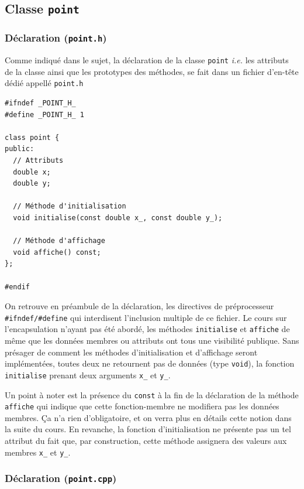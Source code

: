 \documentclass{book}
\begin{document}
\begin{correction}
\subsection*{Classe \texttt{point}}

\subsubsection*{Déclaration (\texttt{point.h})}

Comme indiqué dans le sujet, la déclaration de la classe \texttt{point} \emph{i.e.} les
attributs de la classe ainsi que les prototypes des méthodes, se fait dans un
fichier d'en-tête dédié appellé \texttt{point.h}

\begin{verbatim}
#ifndef _POINT_H_
#define _POINT_H_ 1

class point {
public:
  // Attributs
  double x;
  double y;

  // Méthode d'initialisation
  void initialise(const double x_, const double y_);

  // Méthode d'affichage
  void affiche() const;
};

#endif
\end{verbatim}

On retrouve en préambule de la déclaration, les directives de préprocesseur
\texttt{\#ifndef/\#define} qui interdisent l'inclusion multiple de ce fichier. Le cours sur
l'encapsulation n'ayant pas été abordé, les méthodes \texttt{initialise} et \texttt{affiche} de
même que les données membres ou attributs ont tous une visibilité publique. Sans
présager de comment les méthodes d'initialisation et d'affichage seront
implémentées, toutes deux ne retournent pas de données (type \texttt{void}), la fonction
\texttt{initialise} prenant deux arguments \texttt{x\_} et \texttt{y\_}.

Un point à noter est la présence du \texttt{const} à la fin de la déclaration de la méthode \texttt{affiche} qui indique que cette fonction-membre ne modifiera pas les données membres. Ça n'a rien d'obligatoire, et on verra plus en détails cette notion dans la suite du cours. En revanche, la fonction d'initialisation ne présente pas un tel attribut du fait que, par construction, cette méthode assignera des valeurs aux membres \texttt{x\_} et \texttt{y\_}.

\subsubsection*{Déclaration (\texttt{point.cpp})}


\end{correction}
\end{document}
